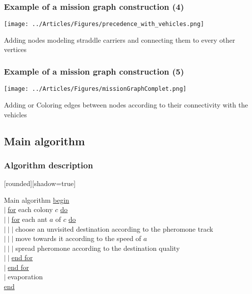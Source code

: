 \documentclass{beamer}
\begin{document}
\begin{frame}
	\frametitle{Example of a mission graph construction (4)}
 	\begin{center}
 		\texttt{[image: ../Articles/Figures/precedence\_with\_vehicles.png]}
		
		Adding nodes modeling straddle carriers and connecting them to every other vertices
	\end{center}
\end{frame}
\begin{frame}
	\frametitle{Example of a mission graph construction (5)}
 	\begin{center}
 		\texttt{[image: ../Articles/Figures/missionGraphComplet.png]}
		
		Adding or Coloring edges between nodes according to their connectivity with the vehicles
	\end{center}
\end{frame}
\subsection*{Main algorithm}

\begin{frame}
\frametitle{Algorithm description}
	[rounded][shadow=true]
	\begin{block}{Main algorithm}
	\underline{begin}\\
	$\vert \;$\underline{for} each colony $c$ \underline{do}\\
	$\vert \;\vert \;$\underline{for} each ant $a$ of $c$ \underline{do}\\
	$\vert \;\vert \;\vert \;$choose an unvisited destination according to the pheromone track\\
	$\vert \;\vert \;\vert \;$move towards it according to the speed of $a$\\
	$\vert \;\vert \;\vert \;$spread pheromone according to the destination quality\\
	$\vert \;\vert \;$\underline{end for}\\
	$\vert \;$\underline{end for}\\
	$\vert \;$evaporation\\
	\underline{end}\\
	\end{block}
\end{frame}
\end{document}

